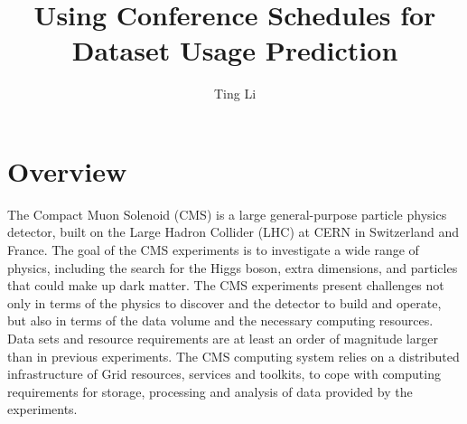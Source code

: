 \documentclass[final, 12pt]{elsarticle}
\begin{document}
\begin{frontmatter}


  \title{Using Conference Schedules for Dataset Usage Prediction}




  \author{Ting Li}

  \address{Advisor: Valentin Kuznetsov}


\end{frontmatter}

\section{Overview}
\label{S:1}


The Compact Muon Solenoid (CMS) is a large general-purpose particle physics detector, built on the Large Hadron Collider (LHC) at CERN in Switzerland and France. The goal of the CMS experiments is to investigate a wide range of physics, including the search for the Higgs boson, extra dimensions, and particles that could make up dark matter.
The CMS experiments present challenges not only in terms of the physics to discover and the detector to build and operate, but also in terms of the data volume and the necessary computing resources. Data sets and resource requirements are at least an order of magnitude larger than in previous experiments.
The CMS computing system relies on a distributed infrastructure of Grid resources, services and toolkits, to cope with computing requirements for storage, processing and analysis of data provided by the experiments.
\end{document}

